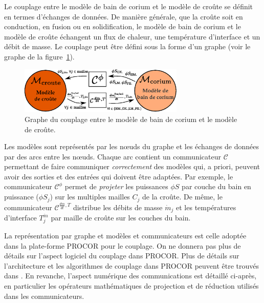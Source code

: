 Le couplage entre le modèle de bain de corium et le modèle de croûte se définit en termes d'échanges de données. De manière générale, que la croûte soit en conduction, en fusion ou en solidification, le modèle de bain de corium et le modèle de croûte échangent un flux de chaleur, une température d'interface et un débit de masse. Le couplage peut être défini sous la forme d'un graphe (voir le graphe de la figure~\ref{fig:graphe_couplage_corium_croute}). 
\begin{figure}
\centering
\includegraphics[width=0.7\textwidth, keepaspectratio=true]{Figures/graphe_couplage_corium_croute.eps}
\caption{Graphe du couplage entre le modèle de bain de corium et le modèle de croûte.}
\label{fig:graphe_couplage_corium_croute}
\end{figure}
Les modèles sont représentés par les n\oe{}uds du graphe et les échanges de données par des arcs entre les n\oe{}uds. Chaque arc contient un communicateur $\mathcal{C}$ permettant de faire communiquer \emph{correctement} des modèles qui, a priori, peuvent avoir des sorties et des entrées qui doivent être adaptées. Par exemple, le communicateur $\mathcal{C}^{\phi}$ permet de \emph{projeter} les puissances $\phi S$ par couche du bain en puissance ($\phi S_j$) sur les multiples mailles $C_j$ de la croûte. De même, le communicateur $\mathcal{C}^{\frac{dm}{dt}, T}$ distribue les débits de masse $\dot{m}_j$ et les températures d'interface $T_j^{in}$ par maille de croûte sur les couches du bain. 

La représentation par graphe et modèles et communicateurs est celle adoptée dans la plate-forme PROCOR pour le couplage. On ne donnera pas plus de détails sur l'aspect logiciel du couplage dans PROCOR. Plus de détails sur l'architecture et les algorithmes de couplage dans PROCOR peuvent être trouvés dans \cite{Viot2018}. En revanche, l'aspect numérique des communications est détaillé ci-après, en particulier les opérateurs mathématiques de projection et de réduction utilisés dans les communicateurs.

